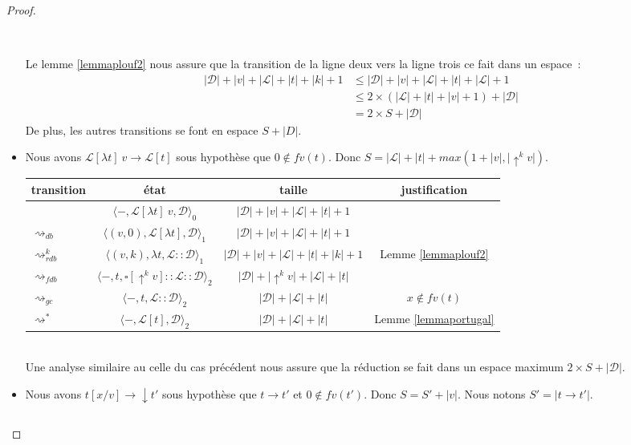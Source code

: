 \documentclass[11pt,a4paper]{article}
\theoremstyle{definition}
\newcommand{\etatz}[1]{\langle #1 \rangle_0}
\newcommand{\etatu}[1]{\langle #1 \rangle_1}
\newcommand{\etatd}[1]{\langle #1 \rangle_2}
\newcommand{\mcd}{\mathcal{D}}
\newcommand{\mcl}{\mathcal{L}}
\newcommand{\mtd}{\mathcal{D}}
\newcommand{\mtl}{\mathcal{L}}
\newcommand{\da}{\downarrow}
\newcommand{\ua}{\uparrow}
\begin{document}
\begin{proof}
\begin{itemize}
\begin{tabular}{@{}l c c c@{}}
        \bottomrule
      \end{tabular}\\
      Le lemme \ref{lemmaplouf2} nous assure que la transition de la ligne deux vers la ligne trois ce fait dans un espace~:
     \begin{align*} 
       |\mtd|+ |v| + |\mtl|+|t|+|k|+1 &\le |\mtd| + |v| + |\mtl|+|t|+|\mtl|+1 \\
        &\le 2 \times (|\mtl|+|t|+|v|+1)+|\mcd|\\ 
        &= 2 \times S + |\mcd|
     \end{align*}
      De plus, les autres transitions se font en espace $S+|D|$.
    \item {} Nous avons $\mtl[\lambda t]~v \rightarrow \mtl[t]$ sous hypothèse que $0\notin fv(t)$. Donc $S = |\mcl|+|t|+max(1+|v|, |\ua^k v|)$.\\
      \begin{tabular}{@{}l c c c@{}}
        \toprule
        transition & état & taille & justification\\
        \midrule
                  & $\etatz{-,\mcl[\lambda t]~v,\mcd}$ & $|\mcd|+|v|+|\mcl|+|t|+1$\\
        $\rightsquigarrow_{db}$ & $ \etatu{(v,0), \mcl[ \lambda t], \mcd}$ & $|\mcd| + |v| + |\mcl|+|t|+1$\\ 
        $\rightsquigarrow^k_{rdb}$ & $ \etatu{(v,k), \lambda t ,\mtl::\mtd}$ & $|\mtd| + |v| + |\mtl|+|t|+|k|+1$& Lemme \ref{lemmaplouf2}\\
        $\rightsquigarrow_{fdb}$ & $ \etatd{-, t ,\square[\ua^k v]::\mtl::\mtd}$ & $|\mtd| + |\ua^k v| + |\mtl|+|t|$\\
        $\rightsquigarrow_{gc}$ & $ \etatd{-, t ,\mtl::\mtd}$ & $|\mtd| + |\mtl|+|t|$& $x\notin fv(t)$\\
        $\rightsquigarrow^*$ & $ \etatd{-, \mtl[t],\mtd}$ & $|\mtd| + |\mtl|+|t|$ &Lemme \ref{lemmaportugal}\\ 
        \bottomrule
      \end{tabular}\\
      Une analyse similaire au celle du cas précédent nous assure que la réduction se fait dans un espace maximum $2\times S +|\mtd|$.
    \item {} Nous avons $t[x/v] \rightarrow \da t'$ sous hypothèse que $t \rightarrow t'$ et $0\notin fv(t')$. Donc $S = S'+|v|$. Nous notons $S' = |t \rightarrow t'| $.\\
      \begin{tabular}{@{}l c c c@{}}

\end{tabular}
\end{itemize}
\end{proof}
\end{document}
